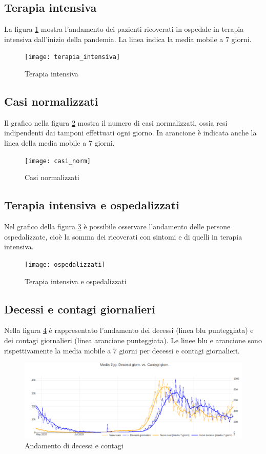 \subsection{Terapia intensiva}
La figura \ref{fig:terapia_intensiva} mostra l'andamento dei pazienti ricoverati in ospedale in terapia intensiva dall'inizio della pandemia.
La linea indica la media mobile a 7 giorni.
\begin{figure}[htp]
    \centering
    \texttt{[image: terapia\_intensiva]}
    \caption{Terapia intensiva}
    \label{fig:terapia_intensiva}
\end{figure}

\subsection{Casi normalizzati}
Il grafico nella figura \ref{fig:casi_normalizzati} mostra il numero di casi normalizzati, ossia resi indipendenti dai tamponi effettuati ogni giorno.
In arancione è indicata anche la linea della media mobile a 7 giorni.
\begin{figure}[htp]
    \centering
    \texttt{[image: casi\_norm]}
    \caption{Casi normalizzati}
    \label{fig:casi_normalizzati}
\end{figure}

\subsection{Terapia intensiva e ospedalizzati}
Nel grafico della figura \ref{fig:ti_ospdedalizzati} è possibile osservare l'andamento delle persone ospedalizzate, cioè la somma dei ricoverati con sintomi e di quelli in terapia intensiva.
\begin{figure}[htp]
    \centering
    \texttt{[image: ospedalizzati]}
    \caption{Terapia intensiva e ospedalizzati}
    \label{fig:ti_ospdedalizzati}
\end{figure}

\subsection{Decessi e contagi giornalieri}
Nella figura \ref{fig:decessi_contagi_medie} è rappresentato l'andamento dei decessi (linea blu punteggiata) e dei contagi giornalieri (linea arancione punteggiata).
Le linee blu e arancione sono rispettivamente la media mobile a 7 giorni per decessi e contagi giornalieri.
\begin{figure}[htp]
    \centering
    \includegraphics[width=14cm]{img/decessi_vs_contagi.png}
    \caption{Andamento di decessi e contagi}
    \label{fig:decessi_contagi_medie}
\end{figure}

